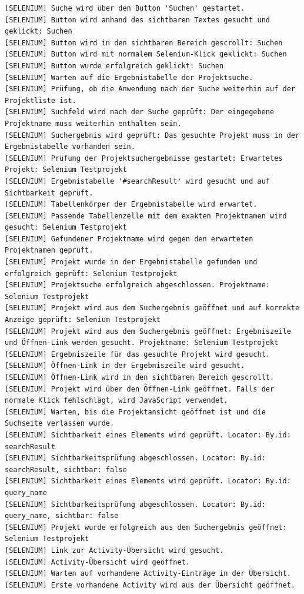 \begin{lstlisting}[caption={Selenium -- Kontrolllauf Activity bearbeiten (Erfolgreich)}, label={lst:sel_ctrl_act_ok}, style=logStyle]
[SELENIUM] Suche wird über den Button 'Suchen' gestartet.
[SELENIUM] Button wird anhand des sichtbaren Textes gesucht und geklickt: Suchen
[SELENIUM] Button wird in den sichtbaren Bereich gescrollt: Suchen
[SELENIUM] Button wird mit normalem Selenium-Klick geklickt: Suchen
[SELENIUM] Button wurde erfolgreich geklickt: Suchen
[SELENIUM] Warten auf die Ergebnistabelle der Projektsuche.
[SELENIUM] Prüfung, ob die Anwendung nach der Suche weiterhin auf der Projektliste ist.
[SELENIUM] Suchfeld wird nach der Suche geprüft: Der eingegebene Projektname muss weiterhin enthalten sein.
[SELENIUM] Suchergebnis wird geprüft: Das gesuchte Projekt muss in der Ergebnistabelle vorhanden sein.
[SELENIUM] Prüfung der Projektsuchergebnisse gestartet: Erwartetes Projekt: Selenium Testprojekt
[SELENIUM] Ergebnistabelle '#searchResult' wird gesucht und auf Sichtbarkeit geprüft.
[SELENIUM] Tabellenkörper der Ergebnistabelle wird erwartet.
[SELENIUM] Passende Tabellenzelle mit dem exakten Projektnamen wird gesucht: Selenium Testprojekt
[SELENIUM] Gefundener Projektname wird gegen den erwarteten Projektnamen geprüft.
[SELENIUM] Projekt wurde in der Ergebnistabelle gefunden und erfolgreich geprüft: Selenium Testprojekt
[SELENIUM] Projektsuche erfolgreich abgeschlossen. Projektname: Selenium Testprojekt
[SELENIUM] Projekt wird aus dem Suchergebnis geöffnet und auf korrekte Anzeige geprüft: Selenium Testprojekt
[SELENIUM] Projekt wird aus dem Suchergebnis geöffnet: Ergebniszeile und Öffnen-Link werden gesucht. Projektname: Selenium Testprojekt
[SELENIUM] Ergebniszeile für das gesuchte Projekt wird gesucht.
[SELENIUM] Öffnen-Link in der Ergebniszeile wird gesucht.
[SELENIUM] Öffnen-Link wird in den sichtbaren Bereich gescrollt.
[SELENIUM] Projekt wird über den Öffnen-Link geöffnet. Falls der normale Klick fehlschlägt, wird JavaScript verwendet.
[SELENIUM] Warten, bis die Projektansicht geöffnet ist und die Suchseite verlassen wurde.
[SELENIUM] Sichtbarkeit eines Elements wird geprüft. Locator: By.id: searchResult
[SELENIUM] Sichtbarkeitsprüfung abgeschlossen. Locator: By.id: searchResult, sichtbar: false
[SELENIUM] Sichtbarkeit eines Elements wird geprüft. Locator: By.id: query_name
[SELENIUM] Sichtbarkeitsprüfung abgeschlossen. Locator: By.id: query_name, sichtbar: false
[SELENIUM] Projekt wurde erfolgreich aus dem Suchergebnis geöffnet: Selenium Testprojekt
[SELENIUM] Link zur Activity-Übersicht wird gesucht.
[SELENIUM] Activity-Übersicht wird geöffnet.
[SELENIUM] Warten auf vorhandene Activity-Einträge in der Übersicht.
[SELENIUM] Erste vorhandene Activity wird aus der Übersicht geöffnet.

\end{lstlisting}
